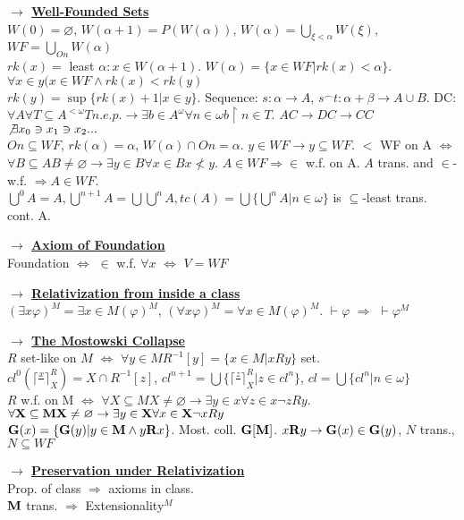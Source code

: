 \documentclass[9pt]{article}
\newcommand{\class}[1]{{\bf #1}}
\newcommand{\mytitle}[1]{ {\bf $\rightarrow$ \underline{#1}}\\}
\begin{document}
\begin{multicols*}{2}
\mytitle{Well-Founded Sets}
$W(0)=\varnothing$, $W(\alpha+1)=P(W(\alpha))$, $W(\alpha)=\bigcup\limits_{\xi<\alpha}W(\xi)$, $WF=\bigcup\limits_{On}W(\alpha)$\\
$rk(x)=$ least $\alpha\colon x\in W(\alpha+1)$. $W(\alpha)=\{x\in WF|rk(x)<\alpha\}$. $\forall x\in y (x\in WF\wedge rk(x)<rk(y)$\\
$rk(y)=\sup\{rk(x)+1|x\in y\}$. Sequence: $s\colon\alpha\to A$, $s^\smallfrown t\colon \alpha+\beta\to A\cup B$.
DC: $\forall A\forall T\subseteq A^{<\omega} T n.e.p. \to \exists b\in A^\omega \forall n\in\omega b\upharpoonright n\in T$. $AC\to DC\to CC$\\
$\not\exists x_0\ni x_1\ni x_2...$\\ $On\subseteq WF$, $rk(\alpha)=\alpha$, $W(\alpha)\cap On=\alpha$. $y\in WF\to y\subseteq WF$. $<$ WF on A $\Leftrightarrow$ $\forall B\subseteq A B\neq \varnothing\to\exists y\in B\forall x\in B x\nless y$. $A\in WF\Rightarrow \in$ w.f. on A. $A$ trans. and $\in$-w.f. $\Rightarrow A\in WF$.\\
$\bigcup^0A=A,\bigcup^{n+1}A=\bigcup\bigcup^{n}A,tc(A)=\bigcup\{\bigcup^n A|n\in\omega\}$ is $\subseteq$-least trans. cont. A.

\mytitle{Axiom of Foundation}
Foundation $\Leftrightarrow$ $\in$ w.f. $\forall x$ $\Leftrightarrow$ $V=WF$

\mytitle{Relativization from inside a class}
$(\exists x \varphi)^M=\exists x\in M(\varphi)^M$, $(\forall x \varphi)^M=\forall x\in M(\varphi)^M$. $\vdash\varphi$ $\Rightarrow$ $\vdash\varphi^M$

\mytitle{The Mostowski Collapse}
$R$ set-like on $M$ $\Leftrightarrow$ $\forall y\in M R^{-1}[y]=\{x\in M|xRy\}$ set.\\
$cl^0(\lceil\frac{x}{}\rceil^R_X)=X\cap R^{-1}[z]$, $cl^{n+1}=\bigcup\{\lceil\frac{z}{}\rceil^R_X|z\in cl^n\}$, $cl=\bigcup \{cl^n|n\in\omega\}$\\
$R$ w.f. on M $\Leftrightarrow$ $\forall X\subseteq M X\neq\varnothing\to\exists y\in x\forall z\in x \neg zRy$.
$\forall\class{X}\subseteq\class{M} \class{X}\neq\varnothing\to\exists y\in\class{X}\forall x\in\class{X}\neg xRy$\\
$\class{G}(x)=\{\class{G}(y)|y\in\class{M}\wedge y\class{R}x\}$. Most. coll. $\class{G}[\class{M}]$. $x\class{R}y\to \class{G}(x)\in\class{G}(y)$, $N$ trans., $N\subseteq WF$

\mytitle{Preservation under Relativization}
Prop. of class $\Rightarrow$ axioms in class.\\
$\class{M}$ trans. $\Rightarrow$ Extensionality$^M$


\end{multicols*}
\end{document}
